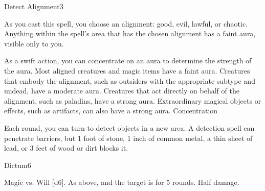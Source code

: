 \begin{spellsection}{Detect Alignment}{3}
\begin{spellheader}
\end{spellheader}
\begin{spellcontent}
    \begin{spelltargetinginfo}
    \end{spelltargetinginfo}
    \begin{spelleffects}
        \spelleffect As you cast this spell, you choose an alignment: good, evil, lawful, or chaotic. Anything within the spell's area that has the chosen alignment has a faint aura, visible only to you.

        As a swift action, you can concentrate on an aura to determine the strength of the aura. Most aligned creatures and magic items have a faint aura. Creatures that embody the alignment, such as outsiders with the appropriate subtype and undead,  have a moderate aura. Creatures that act directly on behalf of the alignment, such as paladins, have a strong aura. Extraordinary magical objects or effects, such as artifacts, can also have a strong aura.
        \spelldur Concentration
    \end{spelleffects}
\end{spellcontent}
\begin{spellfooter}
    \spellnotes Each round, you can turn to detect objects in a new area. A detection spell can penetrate barriers, but 1 foot of stone, 1 inch of common metal, a thin sheet of lead, or 3 feet of wood or dirt blocks it.
\end{spellfooter}
\end{spellsection}

\begin{spellsection}{Dictum}{6}
\begin{spellheader}
\end{spellheader}
\begin{spellcontent}
    \begin{spelltargetinginfo}
    \end{spelltargetinginfo}
    \begin{spelleffects}
        \begin{spellattack}{Magic vs. Will}
            \spellsuccess {}[d6].
            \spellcritical As above, and the target is \immobilized for 5 rounds.
            \spellfailure Half damage.
        \end{spellattack}
    \end{spelleffects}
\end{spellcontent}
\begin{spellfooter}
\end{spellfooter}
\end{spellsection}

